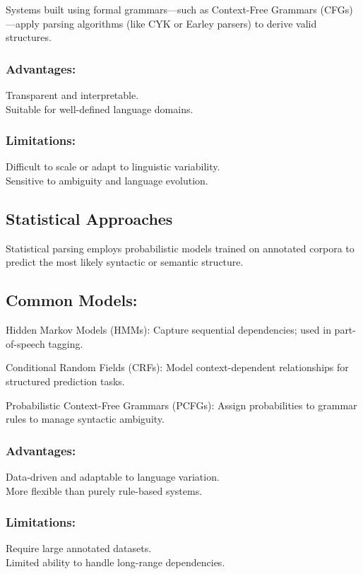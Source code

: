 \documentclass[10pt]{article}
\begin{document}
Systems built using formal grammars—such as Context-Free Grammars (CFGs)—apply parsing algorithms (like CYK or Earley parsers) to derive valid structures.

\subsubsection*{Advantages:}
Transparent and interpretable.\\
Suitable for well-defined language domains.

\subsubsection*{Limitations:}
Difficult to scale or adapt to linguistic variability.\\
Sensitive to ambiguity and language evolution.

\subsection*{Statistical Approaches}
Statistical parsing employs probabilistic models trained on annotated corpora to predict the most likely syntactic or semantic structure.

\subsection*{Common Models:}
Hidden Markov Models (HMMs): Capture sequential dependencies; used in part-of-speech tagging.

Conditional Random Fields (CRFs): Model context-dependent relationships for structured prediction tasks.

Probabilistic Context-Free Grammars (PCFGs): Assign probabilities to grammar rules to manage syntactic ambiguity.

\subsubsection*{Advantages:}
Data-driven and adaptable to language variation.\\
More flexible than purely rule-based systems.\\
\subsubsection*{Limitations:}

Require large annotated datasets.\\
Limited ability to handle long-range dependencies.
\end{document}
